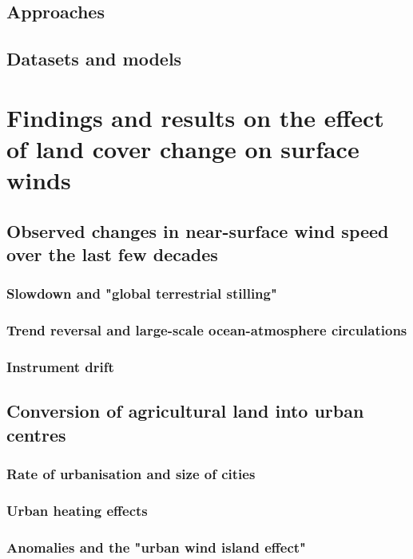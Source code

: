 \documentclass[12pt,a4paper,twoside]{book}
\begin{document}
\subsection{Approaches}

\subsection{Datasets and models}

\section{Findings and results on the effect of land cover change on surface winds}

\subsection{Observed changes in near-surface wind speed over the last few decades}

\subsubsection{Slowdown and "global terrestrial stilling"}

\subsubsection{Trend reversal and large-scale ocean-atmosphere circulations}

\subsubsection{Instrument drift}

\subsection{Conversion of agricultural land into urban centres}

\subsubsection{Rate of urbanisation and size of cities}

\subsubsection{Urban heating effects}

\subsubsection{Anomalies and the "urban wind island effect"}
\end{document}
